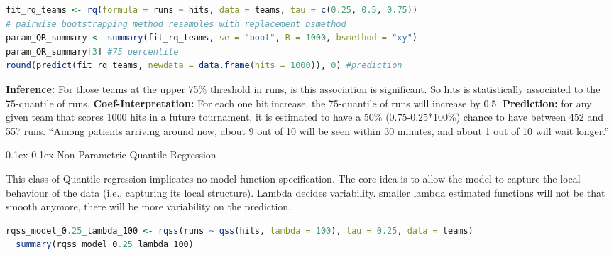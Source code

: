 \documentclass[8pt,landscape]{article}
\makeatletter
\renewcommand{\subsection}{\@startsection{subsection}{2}{0pt}%
    {0.1ex}%
    {0.1ex}%
    {\fontsize{8}{9}\bfseries\color{blue}}} %
\newcommand{\smalltext}[1]{
  {\fontsize{8}{9}\selectfont\sloppy #1\par}
}
\makeatother
\begin{document}
\begin{multicols}{3}
\begin{lstlisting}[language=R]
fit_rq_teams <- rq(formula = runs ~ hits, data = teams, tau = c(0.25, 0.5, 0.75))
# pairwise bootstrapping method resamples with replacement bsmethod
param_QR_summary <- summary(fit_rq_teams, se = "boot", R = 1000, bsmethod = "xy")
param_QR_summary[3] #75 percentile
round(predict(fit_rq_teams, newdata = data.frame(hits = 1000)), 0) #prediction
\end{lstlisting}
\smalltext{
  \textbf{Inference:} For those teams at the upper 75\% threshold in runs, is this association is significant. So hits is statistically associated to the 75-quantile of runs.
  \textbf{Coef-Interpretation:} For each one hit increase, the 75-quantile of runs will increase by 0.5.
  \textbf{Prediction:} for any given team that scores 1000 hits in a future tournament, it is estimated to have a 50\% (0.75-0.25*100\%) chance to have between 452 and 557 runs.
  “Among patients arriving around now, about 9 out of 10 will be seen within 30 minutes, and about 1 out
of 10 will wait longer.”
}

\subsection{Non-Parametric Quantile Regression}
\smalltext{This class of Quantile regression implicates no model function specification. The core idea is to allow the model to capture the local behaviour of the data (i.e., capturing its local structure).
Lambda decides variability. smaller lambda estimated functions will not be that smooth anymore, there will be more variability on the prediction.
}
\begin{lstlisting}[language=R]
  rqss_model_0.25_lambda_100 <- rqss(runs ~ qss(hits, lambda = 100), tau = 0.25, data = teams)
  summary(rqss_model_0.25_lambda_100)
\end{lstlisting}


\end{multicols}
\end{document}
